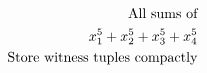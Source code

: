 \documentclass[preview]{standalone}
\begin{document}
\begin{align*}
\special{dvisvgm:raw <g id='unique000'>}\text{All sums of} \\ x_1^5 + x_2^5 + x_3^5 + x_4^5 \\ \text{Store witness tuples compactly}\special{dvisvgm:raw </g>}
\end{align*}
\end{document}
